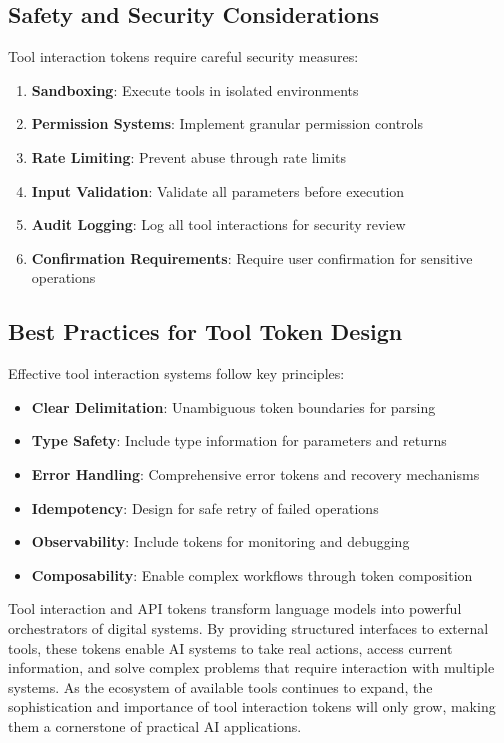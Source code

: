 \subsection{Safety and Security Considerations}

Tool interaction tokens require careful security measures:

\begin{enumerate}
\item \textbf{Sandboxing}: Execute tools in isolated environments
\item \textbf{Permission Systems}: Implement granular permission controls
\item \textbf{Rate Limiting}: Prevent abuse through rate limits
\item \textbf{Input Validation}: Validate all parameters before execution
\item \textbf{Audit Logging}: Log all tool interactions for security review
\item \textbf{Confirmation Requirements}: Require user confirmation for sensitive operations
\end{enumerate}

\subsection{Best Practices for Tool Token Design}

Effective tool interaction systems follow key principles:

\begin{itemize}
\item \textbf{Clear Delimitation}: Unambiguous token boundaries for parsing
\item \textbf{Type Safety}: Include type information for parameters and returns
\item \textbf{Error Handling}: Comprehensive error tokens and recovery mechanisms
\item \textbf{Idempotency}: Design for safe retry of failed operations
\item \textbf{Observability}: Include tokens for monitoring and debugging
\item \textbf{Composability}: Enable complex workflows through token composition
\end{itemize}

Tool interaction and API tokens transform language models into powerful orchestrators of digital systems. By providing structured interfaces to external tools, these tokens enable AI systems to take real actions, access current information, and solve complex problems that require interaction with multiple systems. As the ecosystem of available tools continues to expand, the sophistication and importance of tool interaction tokens will only grow, making them a cornerstone of practical AI applications.